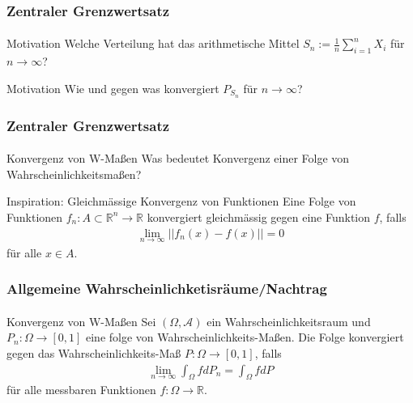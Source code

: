 \documentclass{beamer}
\begin{document}
\begin{frame}
    \frametitle{Zentraler Grenzwertsatz}
\framesubtitle{}

\begin{block}{Motivation}
Welche Verteilung hat das arithmetische Mittel $S_n:= \frac{1}{n} \sum_{i=1}^n X_i$ für $n \to \infty$?
\end{block}
\begin{block}{Motivation}
Wie und gegen was konvergiert $P_{S_n}$ für $n \to \infty$?
\end{block}

 \end{frame}




\begin{frame}
    \frametitle{Zentraler Grenzwertsatz}
\framesubtitle{}

\begin{block}{Konvergenz von W-Maßen}
Was bedeutet Konvergenz einer Folge von Wahrscheinlichkeitsmaßen?
\end{block}
\begin{block}{Inspiration: Gleichmässige Konvergenz von Funktionen}
Eine Folge von Funktionen $f_n: A \subset \mathbb{R}^n \to \mathbb{R}$ konvergiert gleichmässig gegen eine Funktion $f$, falls 
\begin{align*}
\lim_{n \to \infty} ||f_n(x) -f(x) || = 0
\end{align*}
für alle $x \in A$.
\end{block}

 \end{frame}

\begin{frame}
    \frametitle{Allgemeine Wahrscheinlichketisräume/Nachtrag}
\framesubtitle{}

\begin{block}{Konvergenz von W-Maßen}
Sei $(\Omega, \mathcal{A})$ ein Wahrscheinlichkeitsraum und $P_n : \Omega \to [0,1]$ eine folge von Wahrscheinlichkeits-Maßen. Die Folge konvergiert gegen
das Wahrscheinlichkeits-Maß $P: \Omega \to [0,1]$, falls 
\begin{align*}
\lim_{n \to \infty} \int_\Omega f dP_n = \int_\Omega f dP
\end{align*}
für alle messbaren Funktionen $f: \Omega \to \mathbb{R}$.
\end{block}
 \end{frame}
\end{document}

